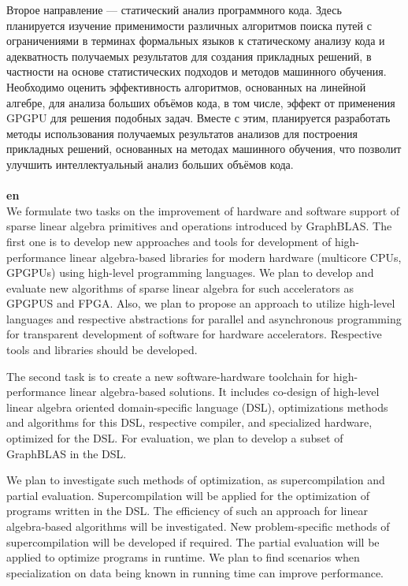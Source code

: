 \documentclass[12pt]{article}  %
\theoremstyle{remark}
\begin{document}
Второе направление --- статический анализ программного кода. Здесь планируется изучение применимости различных алгоритмов поиска путей с ограничениями в терминах формальных языков к статическому анализу кода и адекватность получаемых результатов для создания прикладных решений, в частности на основе статистических подходов и методов машинного обучения. Необходимо оценить эффективность алгоритмов, основанных на линейной алгебре, для анализа больших объёмов кода, в том числе, эффект от применения GPGPU для решения подобных задач. Вместе с этим, планируется разработать методы использования получаемых результатов анализов для построения прикладных решений, основанных на методах машинного обучения, что позволит улучшить интеллектуальный анализ больших объёмов кода.
\\
\\
\textbf{en}\\
 
 We formulate two tasks on the improvement of hardware and software support of sparse linear algebra primitives and operations introduced by GraphBLAS. The first one is to develop new approaches and tools for development of high-performance linear algebra-based libraries for modern hardware (multicore CPUs, GPGPUs) using high-level programming languages. We plan to develop and evaluate new algorithms of sparse linear algebra for such accelerators as GPGPUS and FPGA. Also, we plan to propose an approach to utilize high-level languages and respective abstractions for parallel and asynchronous programming for transparent development of software for hardware accelerators. Respective tools and libraries should be developed.
 
 The second task is to create a new software-hardware toolchain for high-performance linear algebra-based solutions. It includes co-design of high-level linear algebra oriented domain-specific language (DSL), optimizations methods and algorithms for this DSL, respective compiler, and specialized hardware, optimized for the DSL. For evaluation, we plan to develop a subset of GraphBLAS in the DSL.
 
 We plan to investigate such methods of optimization, as supercompilation and partial evaluation. Supercompilation will be applied for the optimization of programs written in the DSL. The efficiency of such an approach for linear algebra-based algorithms will be investigated. New problem-specific methods of supercompilation will be developed if required. The partial evaluation will be applied to optimize programs in runtime. We plan to find scenarios when specialization on data being known in running time can improve performance.
 
\end{document}
